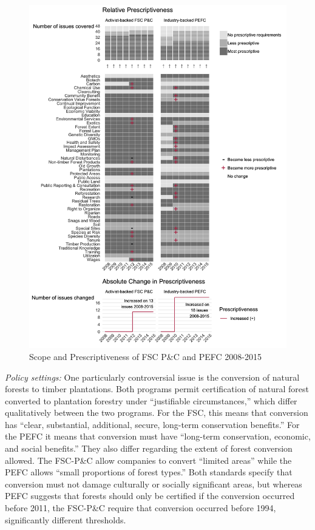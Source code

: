 \documentclass[
      12pt,
            Review ]{article}
\begin{document}
\begin{figure}
\centering
\includegraphics{FSC-PEFC-1.png}
\caption{Scope and Prescriptiveness of FSC P\&C and PEFC 2008-2015}
\end{figure}

\emph{Policy settings:} One particularly controversial issue is the
conversion of natural forests to timber plantations. Both programs
permit certification of natural forest converted to plantation forestry
under ``justifiable circumstances,'' which differ qualitatively between
the two programs. For the FSC, this means that conversion has ``clear,
substantial, additional, secure, long-term conservation benefits.'' For
the PEFC it means that conversion must have ``long-term conservation,
economic, and social benefits.'' They also differ regarding the extent
of forest conversion allowed. The FSC-P\&C allow companies to convert
``limited areas'' while the PEFC allows ``small proportions of forest
types.'' Both standards specify that conversion must not damage
culturally or socially significant areas, but whereas PEFC suggests that
forests should only be certified if the conversion occurred before 2011,
the FSC-P\&C require that conversion occurred before 1994, significantly
different thresholds.
\end{document}
